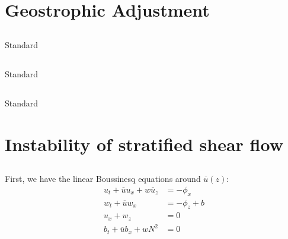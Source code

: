 \documentclass[11pt,letterpaper]{book}
\theoremstyle{definition}
\begin{document}
\section{Geostrophic Adjustment}
\subsection{}
Standard

\subsection{}
Standard

\subsection{}
Standard

\section{Instability of stratified shear flow}\label{Aug_2017_3}
\subsection{}
First, we have the linear Boussinesq equations around $\overline{u}(z)$:
\begin{align}
u_t + \overline{u}u_x+w\overline{u}_z &= -\phi_x\label{eq:jan_2012_1} \\
w_t + \overline{u}w_x &= -\phi_z+b\label{eq:jan_2012_2}\\
u_x + w_z &= 0\label{eq:jan_2012_3}\\
b_t + \overline{u}b_x+wN^2 &= 0\label{eq:jan_2012_4}
\end{align}
\end{document}
